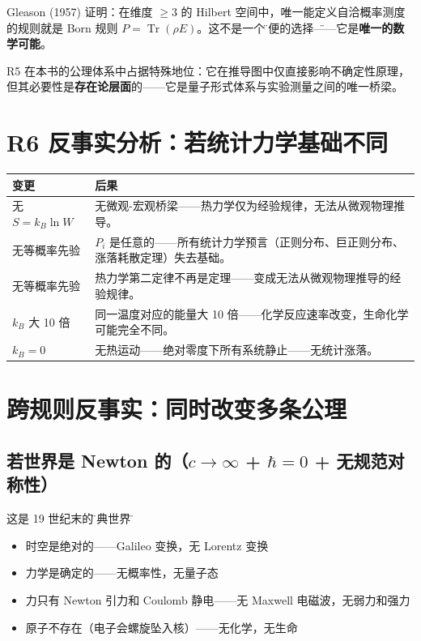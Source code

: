 \begin{insightbox}
  Gleason (1957) 证明：在维度 $\ge 3$ 的 Hilbert 空间中，唯一能定义自洽概率测度的规则就是 Born 规则 $P = \operatorname{Tr}(\rho E)$。这不是一个\"方便的选择\"——它是\textbf{唯一的数学可能}。

  R5 在本书的公理体系中占据特殊地位：它在推导图中仅直接影响不确定性原理，但其必要性是\textbf{存在论层面}的——它是量子形式体系与实验测量之间的唯一桥梁。
\end{insightbox}

\section{R6 反事实分析：若统计力学基础不同}

\begin{center}
\footnotesize
\begin{longtable}{p{3cm}p{10cm}}
\toprule
\textbf{变更} & \textbf{后果} \\
\midrule
无 $S=k_B\ln W$ & 无微观-宏观桥梁——热力学仅为经验规律，无法从微观物理推导。\\
无等概率先验 & $P_i$ 是任意的——所有统计力学预言（正则分布、巨正则分布、涨落耗散定理）失去基础。\\
无等概率先验 & 热力学第二定律不再是定理——变成无法从微观物理推导的经验规律。\\
$k_B$ 大 10 倍 & 同一温度对应的能量大 10 倍——化学反应速率改变，生命化学可能完全不同。\\
$k_B = 0$ & 无热运动——绝对零度下所有系统静止——无统计涨落。\\
\bottomrule
\end{longtable}
\end{center}


\section{跨规则反事实：同时改变多条公理}

\subsection{若世界是 Newton 的（$c\to\infty$ + $\hbar=0$ + 无规范对称性）}

这是 19 世纪末的\"经典世界\"：
\begin{itemize}
  \item 时空是绝对的——Galileo 变换，无 Lorentz 变换
  \item 力学是确定的——无概率性，无量子态
  \item 力只有 Newton 引力和 Coulomb 静电——无 Maxwell 电磁波，无弱力和强力
  \item 原子不存在（电子会螺旋坠入核）——无化学，无生命
\end{itemize}


